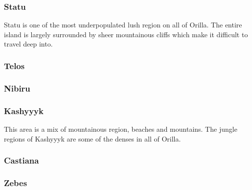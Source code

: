\subsubsection{Statu}

Statu is one of the most underpopulated lush region on all of Orilla. The entire island is largely surrounded by sheer mountainous cliffs which make it difficult to travel deep into. 

\subsubsection{Telos}

\subsubsection{Nibiru}

\subsubsection{Kashyyyk}

This area is a mix of mountainous region, beaches and mountains. The jungle regions of Kashyyyk are some of the denses in all of Orilla.

\subsubsection{Castiana}

\subsubsection{Zebes}

